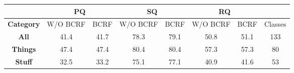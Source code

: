 \begin{table*}[t]
\vspace{-0.2cm}
\hspace{0.2cm}
\centering
{\arraybackslash
\begin{tabular}{c|c|c|c|c|c|c|c}
	\hline
	& \multicolumn{2}{c|}{\textbf{PQ}} & \multicolumn{2}{c|}{\textbf{SQ}} & \multicolumn{2}{c|}{\textbf{RQ}} &         \\ \hline
	\textbf{Category} & W/O BCRF          & BCRF         & W/O BCRF          & BCRF         & W/O BCRF          & BCRF         & Classes \\ \hline
	\textbf{All}      & 41.4              & 41.7         & 78.3              & 79.1         & 50.8              & 51.1         & 133     \\
	\textbf{Things}   & 47.4              & 47.4         & 80.4              & 80.4         & 57.3              & 57.3         & 80      \\
	\textbf{Stuff}    & 32.5              & 33.2         & 75.1              & 77.1         & 40.9              & 41.6         & 53      \\ \hline
\end{tabular}
}
\vspace{0.0cm}
\caption{\label{tbl:coco_values}{\bf COCO dataset.} Panoptic segmentation results on the COCO validation set.}
\vspace{0.5cm}
\end{table*}


